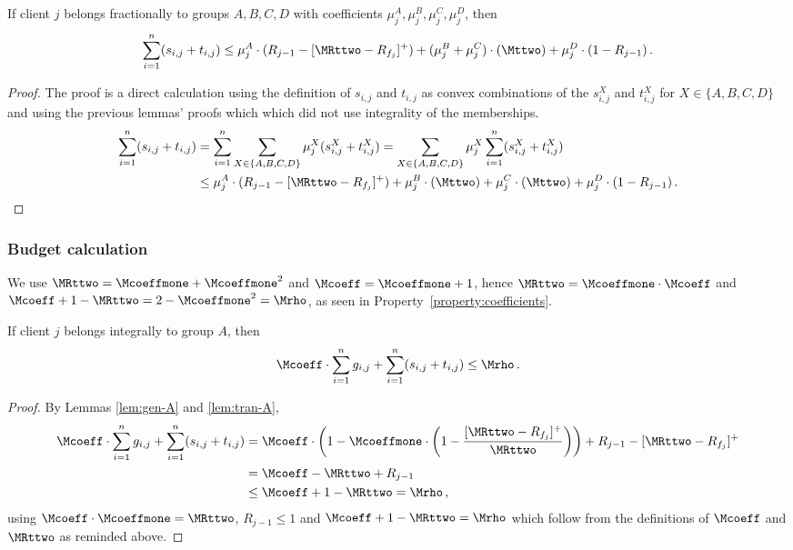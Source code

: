 \begin{lemma}
    \label{lem:tran-fractional}
    If client $j$ belongs fractionally to groups $A,B,C,D$ with coefficients $\mu_j^A, \mu_j^B, \mu_j^C, \mu_j^D$, then
    \begin{equation*}
        \sum_{i=1}^n (s_{i,j} + t_{i,j}) \leq \mu_j^A \cdot (R_{j-1} - [\MRttwo - R_{f_j}]^+) + (\mu_j^B + \mu_j^C) \cdot (\Mttwo) + \mu_j^D \cdot (1 - R_{j-1})\,.
    \end{equation*}
\end{lemma}
\begin{proof}
    The proof is a direct calculation using the definition of $s_{i,j}$ and $t_{i,j}$ as convex combinations of the $s_{i,j}^X$ and $t_{i,j}^X$ for $X \in \{A,B,C,D\}$ and using the previous lemmas' proofs which which did not use integrality of the memberships.
    \begin{align*}
        \sum_{i=1}^n (s_{i,j} + t_{i,j})
        &= \sum_{i=1}^n \sum_{X\in\{A,B,C,D\}} \mu_j^X (s_{i,j}^X + t_{i,j}^X)
        = \sum_{X\in\{A,B,C,D\}} \mu_j^X \sum_{i=1}^n (s_{i,j}^X + t_{i,j}^X) \\
        &\leq \mu_j^A \cdot (R_{j-1} - [\MRttwo - R_{f_j}]^+) + \mu_j^B \cdot (\Mttwo) + \mu_j^C \cdot (\Mttwo) + \mu_j^D \cdot (1 - R_{j-1})\,.
    \end{align*}
\end{proof}

\subsubsection{Budget calculation}

We use $\MRttwo = \Mcoeffmone + \Mcoeffmone^2$ and $\Mcoeff = \Mcoeffmone + 1$, hence $\MRttwo = \Mcoeffmone \cdot \Mcoeff$ and $\Mcoeff + 1 - \MRttwo = 2- \Mcoeffmone^2 = \Mrho$, as seen in Property~\ref{property:coefficients}.

\begin{lemma}
    \label{lem:budget-A}
    If client $j$ belongs integrally to group $A$, then
    \begin{equation*}
        \Mcoeff \cdot \sum_{i=1}^n g_{i,j} + \sum_{i=1}^n (s_{i,j} + t_{i,j}) \leq \Mrho\,.
    \end{equation*}
\end{lemma}
\begin{proof}
    By Lemmas \ref{lem:gen-A} and \ref{lem:tran-A},
    \begin{align*}
        \Mcoeff \cdot \sum_{i=1}^n g_{i,j} + \sum_{i=1}^n (s_{i,j} + t_{i,j})
        &= \Mcoeff \cdot \left(1 - \Mcoeffmone \cdot \left(1 - \frac{[\MRttwo - R_{f_j}]^+}{\MRttwo}\right)\right) + R_{j-1} - [\MRttwo - R_{f_j}]^+ \\
        &= \Mcoeff - \MRttwo + R_{j-1} \\
        &\le \Mcoeff + 1 - \MRttwo = \Mrho\,,
    \end{align*}
    using $\Mcoeff \cdot \Mcoeffmone = \MRttwo$, $R_{j-1} \le 1$ and $\Mcoeff + 1 - \MRttwo = \Mrho$ which follow from the definitions of $\Mcoeff$ and $\MRttwo$ as reminded above.
\end{proof}

